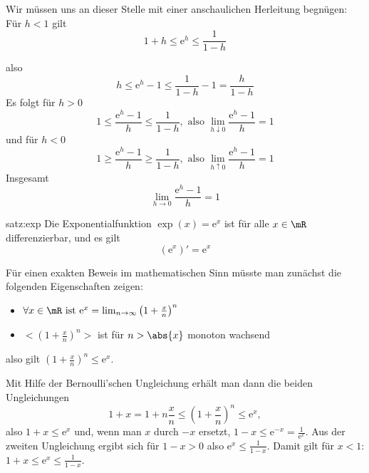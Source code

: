 \documentclass[%
11pt,%
twoside,%
titlepage,%
german,%
headsepline%
]{scrartcl}
\begin{document}
Wir m\"ussen uns an dieser Stelle mit einer anschaulichen Herleitung begn\"ugen:
F\"ur $h<1$ gilt
$$1+h\leq \mathrm{e}^h\leq\frac{1}{1-h}$$
\begin{center}
\end{center}
also
$$h\leq \mathrm{e}^h-1\leq\frac{1}{1-h}-1=\frac{h}{1-h}$$
Es folgt f\"ur $h>0$
$$1\leq\frac{\mathrm{e}^h-1}{h}\leq\frac{1}{1-h},\text{ also }\lim_{h\downarrow0}\frac{\mathrm{e}^h-1}{h}=1$$
und f\"ur $h<0$
$$1\geq\frac{\mathrm{e}^h-1}{h}\geq\frac{1}{1-h},\text{ also }\lim_{h\uparrow0}\frac{\mathrm{e}^h-1}{h}=1$$
Insgesamt
$$\lim_{h\to0}\frac{\mathrm{e}^h-1}{h}=1$$
\begin{csatz}{satz:exp}
Die
Exponentialfunktion $\exp(x)=\mathrm{e}^x$ ist f\"ur alle $x\in\mR$ differenzierbar, und es gilt
$$\left(\mathrm{e}^x\right)'=\mathrm{e}^x$$
\end{csatz}

\begin{bem}
F\"ur einen exakten Beweis im mathematischen Sinn m\"usste man zun\"achst die folgenden Eigenschaften zeigen:
\begin{itemize}
\item $\forall x\in\mR\text{ ist }\mathrm{e}^x=\lim_{n\to\infty}\left(1+\frac{x}{n}\right)^n$
\item $<\left(1+\frac{x}{n}\right)^n>$ ist f\"ur $n>\abs{x}$ monoton wachsend
\end{itemize}
also gilt $\left(1+\frac{x}{n}\right)^n\leq \mathrm{e}^x$.

Mit Hilfe der Bernoulli'schen Ungleichung erh\"alt man dann die beiden Ungleichungen
$$1+x=1+n\frac{x}{n}\leq\left(1+\frac{x}{n}\right)^n\leq \mathrm{e}^x,$$
also $1+x\leq \mathrm{e}^x$ und, wenn man $x$ durch $-x$ ersetzt, $1-x\leq \mathrm{e}^{-x}=\frac{1}{\mathrm{e}^x}$.
Aus der zweiten Ungleichung ergibt sich f\"ur $1-x>0$ also
$\mathrm{e}^x\leq\frac{1}{1-x}.$
Damit gilt f\"ur $x<1$: 
$1+x\leq \mathrm{e}^x\leq\frac{1}{1-x}.$
\end{bem}
\end{document}
